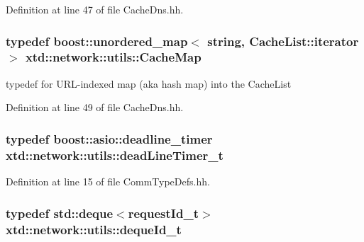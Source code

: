 Definition at line 47 of file Cache\+Dns.\+hh.

\subsubsection[{\texorpdfstring{Cache\+Map}{CacheMap}}]{\setlength{\rightskip}{0pt plus 5cm}typedef boost\+::unordered\+\_\+map$<$ string, Cache\+List\+::iterator $>$ {\bf xtd\+::network\+::utils\+::\+Cache\+Map}}\hypertarget{namespacextd_1_1network_1_1utils_aa648e4975dce81f2fd0a9999f684781d}{}\label{namespacextd_1_1network_1_1utils_aa648e4975dce81f2fd0a9999f684781d}


typedef for U\+R\+L-\/indexed map (aka hash map) into the Cache\+List 



Definition at line 49 of file Cache\+Dns.\+hh.

\subsubsection[{\texorpdfstring{dead\+Line\+Timer\+\_\+t}{deadLineTimer_t}}]{\setlength{\rightskip}{0pt plus 5cm}typedef boost\+::asio\+::deadline\+\_\+timer {\bf xtd\+::network\+::utils\+::dead\+Line\+Timer\+\_\+t}}\hypertarget{namespacextd_1_1network_1_1utils_af551b4a44731a154a57b9447dac595cd}{}\label{namespacextd_1_1network_1_1utils_af551b4a44731a154a57b9447dac595cd}


Definition at line 15 of file Comm\+Type\+Defs.\+hh.

\subsubsection[{\texorpdfstring{deque\+Id\+\_\+t}{dequeId_t}}]{\setlength{\rightskip}{0pt plus 5cm}typedef std\+::deque$<${\bf request\+Id\+\_\+t}$>$ {\bf xtd\+::network\+::utils\+::deque\+Id\+\_\+t}}\hypertarget{namespacextd_1_1network_1_1utils_ac3ca189267ad1167fa141608f8b3a2de}{}\label{namespacextd_1_1network_1_1utils_ac3ca189267ad1167fa141608f8b3a2de}


